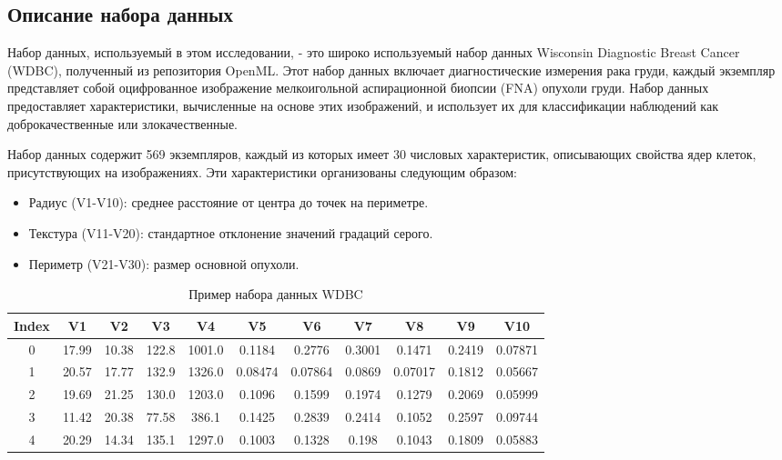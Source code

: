 \documentclass{article}
\begin{document}
\subsection{Описание набора данных}
Набор данных, используемый в этом исследовании, - это широко используемый набор данных Wisconsin Diagnostic Breast Cancer (WDBC), полученный из репозитория OpenML. Этот набор данных включает диагностические измерения рака груди, каждый экземпляр представляет собой оцифрованное изображение мелкоигольной аспирационной биопсии (FNA) опухоли груди. Набор данных предоставляет характеристики, вычисленные на основе этих изображений, и использует их для классификации наблюдений как доброкачественные или злокачественные.

Набор данных содержит 569 экземпляров, каждый из которых имеет 30 числовых характеристик, описывающих свойства ядер клеток, присутствующих на изображениях. Эти характеристики организованы следующим образом:

\begin{itemize}
    \item Радиус (V1-V10): среднее расстояние от центра до точек на периметре.
    \item Текстура (V11-V20): стандартное отклонение значений градаций серого.
    \item Периметр (V21-V30): размер основной опухоли.
\end{itemize}

\begin{table}[h]
\centering
\caption{Пример набора данных WDBC}
\label{table:data}
\begin{tabular}{|c|c|c|c|c|c|c|c|c|c|c|}
\hline
Index & V1    & V2    & V3    & V4     & V5     & V6     & V7     & V8     & V9     & V10    \\ \hline
0     & 17.99 & 10.38 & 122.8 & 1001.0 & 0.1184 & 0.2776 & 0.3001 & 0.1471 & 0.2419 & 0.07871\\ \hline
1     & 20.57 & 17.77 & 132.9 & 1326.0 & 0.08474& 0.07864& 0.0869 & 0.07017& 0.1812 & 0.05667\\ \hline
2     & 19.69 & 21.25 & 130.0 & 1203.0 & 0.1096 & 0.1599 & 0.1974 & 0.1279 & 0.2069 & 0.05999\\ \hline
3     & 11.42 & 20.38 & 77.58 & 386.1  & 0.1425 & 0.2839 & 0.2414 & 0.1052 & 0.2597 & 0.09744\\ \hline
4     & 20.29 & 14.34 & 135.1 & 1297.0 & 0.1003 & 0.1328 & 0.198  & 0.1043 & 0.1809 & 0.05883\\ \hline
\end{tabular}
\end{table}
\end{document}
